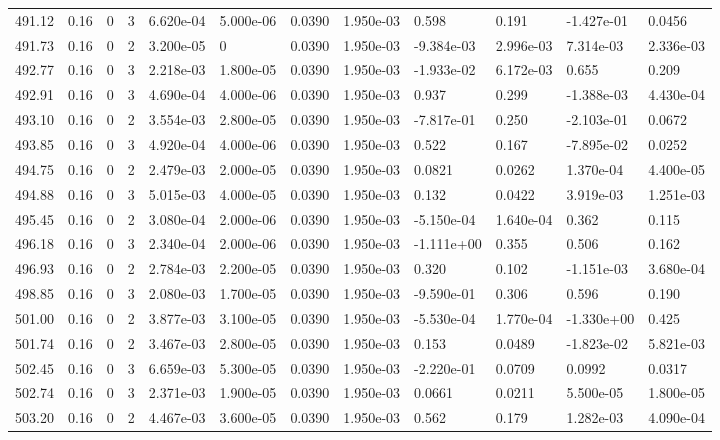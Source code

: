 \documentclass[preview]{standalone}
\begin{document}
{{{{{{{{{{{{{{{\begin{tabular}{L{1.2cm}C{1.2cm} C{0.3cm}C{0.5cm} C{1.4cm}C{1.4cm} C{1.4cm}C{1.4cm} C{1.6cm}C{1.6cm} C{1.6cm}C{1.6cm}}
  491.12  &  0.16  & 0     &  3 &  6.620e-04  & 5.000e-06  &  0.0390&   1.950e-03& 0.598 & 0.191   &  -1.427e-01 & 0.0456  \\ 
  491.73  &  0.16  & 0     &  2 &  3.200e-05  & 0  &  0.0390&   1.950e-03& -9.384e-03 & 2.996e-03   &  7.314e-03 & 2.336e-03  \\ 
  492.77  &  0.16  & 0     &  3 &  2.218e-03  & 1.800e-05  &  0.0390&   1.950e-03& -1.933e-02 & 6.172e-03   &  0.655 & 0.209  \\ 
  492.91  &  0.16  & 0     &  3 &  4.690e-04  & 4.000e-06  &  0.0390&   1.950e-03& 0.937 & 0.299   &  -1.388e-03 & 4.430e-04  \\ 
  493.10  &  0.16  & 0     &  2 &  3.554e-03  & 2.800e-05  &  0.0390&   1.950e-03& -7.817e-01 & 0.250   &  -2.103e-01 & 0.0672  \\ 
  493.85  &  0.16  & 0     &  3 &  4.920e-04  & 4.000e-06  &  0.0390&   1.950e-03& 0.522 & 0.167   &  -7.895e-02 & 0.0252  \\ 
  494.75  &  0.16  & 0     &  2 &  2.479e-03  & 2.000e-05  &  0.0390&   1.950e-03& 0.0821 & 0.0262   &  1.370e-04 & 4.400e-05  \\ 
  494.88  &  0.16  & 0     &  3 &  5.015e-03  & 4.000e-05  &  0.0390&   1.950e-03& 0.132 & 0.0422   &  3.919e-03 & 1.251e-03  \\ 
  495.45  &  0.16  & 0     &  2 &  3.080e-04  & 2.000e-06  &  0.0390&   1.950e-03& -5.150e-04 & 1.640e-04   &  0.362 & 0.115  \\ 
  496.18  &  0.16  & 0     &  3 &  2.340e-04  & 2.000e-06  &  0.0390&   1.950e-03& -1.111e+00 & 0.355   &  0.506 & 0.162  \\ 
  496.93  &  0.16  & 0     &  2 &  2.784e-03  & 2.200e-05  &  0.0390&   1.950e-03& 0.320 & 0.102   &  -1.151e-03 & 3.680e-04  \\ 
  498.85  &  0.16  & 0     &  3 &  2.080e-03  & 1.700e-05  &  0.0390&   1.950e-03& -9.590e-01 & 0.306   &  0.596 & 0.190  \\ 
  501.00  &  0.16  & 0     &  2 &  3.877e-03  & 3.100e-05  &  0.0390&   1.950e-03& -5.530e-04 & 1.770e-04   &  -1.330e+00 & 0.425  \\ 
  501.74  &  0.16  & 0     &  2 &  3.467e-03  & 2.800e-05  &  0.0390&   1.950e-03& 0.153 & 0.0489   &  -1.823e-02 & 5.821e-03  \\ 
  502.45  &  0.16  & 0     &  3 &  6.659e-03  & 5.300e-05  &  0.0390&   1.950e-03& -2.220e-01 & 0.0709   &  0.0992 & 0.0317  \\ 
  502.74  &  0.16  & 0     &  3 &  2.371e-03  & 1.900e-05  &  0.0390&   1.950e-03& 0.0661 & 0.0211   &  5.500e-05 & 1.800e-05  \\ 
  503.20  &  0.16  & 0     &  2 &  4.467e-03  & 3.600e-05  &  0.0390&   1.950e-03& 0.562 & 0.179   &  1.282e-03 & 4.090e-04  \\ 
\hline 
\end{tabular} 

}}}}}}}}}}}}}}}
\end{document}
